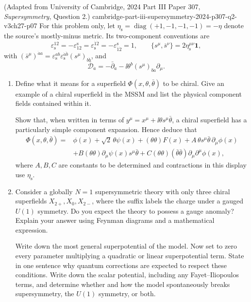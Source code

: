 \begin{enumerate}
    {(Adapted from University of Cambridge, 2024 Part III Paper 307, \emph{Supersymmetry}, Question 2.)}
    {cambridge-part-iii-supersymmetry-2024-p307-q2-v3ch27-p07}
For this problem only, let
  \(\eta_{\mathrm s}=\operatorname{diag}(+1,-1,-1,-1)=-\eta\) denote the
  source's mostly-minus metric.  Its two-component conventions are
  \[
    \varepsilon_{\mathrm s}^{12}=-\varepsilon^{\mathrm s}_{12}
      =\varepsilon_{\mathrm s}^{\dot1\dot2}
      =-\varepsilon^{\mathrm s}_{\dot1\dot2}=1,
    \qquad
    \{s^\mu,\bar s^\nu\}=2\eta_{\mathrm s}^{\mu\nu}\mathbf1,
  \]
  with
  \((\bar s^\mu)^{\dot a a}
    =\varepsilon_{\mathrm s}^{ab}
      \varepsilon_{\mathrm s}^{\dot a\dot b}
      (s^\mu)_{b\dot b}\), and
  \[
    \bar{\mathcal D}_{\dot a}
      =-\bar\partial_{\dot a}
       -\ii\theta^b(s^\mu)_{b\dot a}\partial_\mu.
  \]
  \begin{enumerate}
    \item Define what it means for a superfield
      \(\Phi(x,\theta,\bar\theta)\) to be chiral.  Give an example of a
      chiral superfield in the MSSM and list the physical component fields
      contained within it.

      Show that, when written in terms of
      \(y^\mu=x^\mu+\ii\theta s^\mu\bar\theta\), a chiral superfield has a
      particularly simple component expansion.  Hence deduce that
      \[
      \begin{aligned}
        \Phi(x,\theta,\bar\theta)={}&\phi(x)+\sqrt2\,\theta\psi(x)
          +(\theta\theta)F(x)
          +A\,\theta s^\mu\bar\theta\,\partial_\mu\phi(x)\\
        &+B(\theta\theta)\partial_\mu\psi(x)s^\mu\bar\theta
          +C(\theta\theta)(\bar\theta\bar\theta)
             \partial_\mu\partial^\mu\phi(x),
      \end{aligned}
      \]
      where \(A,B,C\) are constants to be determined and contractions in
      this display use \(\eta_{\mathrm s}\).

    \item Consider a globally \(N=1\) supersymmetric theory with only three
      chiral superfields \(X_{2+},X_0,X_{2-}\), where the suffix labels the
      charge under a gauged \(U(1)\) symmetry.  Do you expect the theory to
      possess a gauge anomaly?  Explain your answer using Feynman diagrams
      and a mathematical expression.

      Write down the most general superpotential of the model.  Now set to
      zero every parameter multiplying a quadratic or linear superpotential
      term.  State in one sentence why quantum corrections are expected to
      respect these conditions.  Write down the scalar potential, including
      any Fayet--Iliopoulos terms, and determine whether and how the model
      spontaneously breaks supersymmetry, the \(U(1)\) symmetry, or both.
  \end{enumerate}


\end{enumerate}
